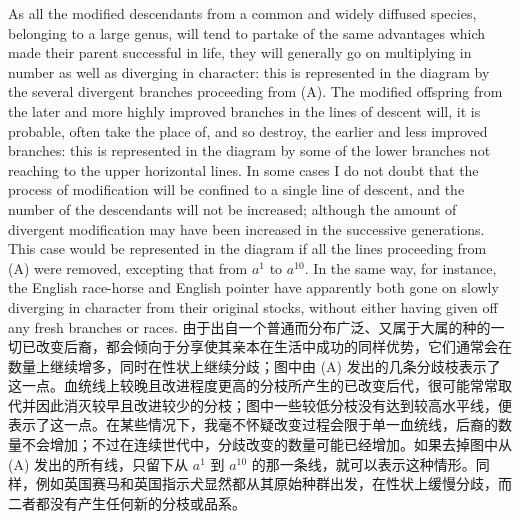 \darwinpair
{As all the modified descendants from a common and widely diffused species, belonging to a large genus, will tend to partake of the same advantages which made their parent successful in life, they will generally go on multiplying in number as well as diverging in character: this is represented in the diagram by the several divergent branches proceeding from (A). The modified offspring from the later and more highly improved branches in the lines of descent will, it is probable, often take the place of, and so destroy, the earlier and less improved branches: this is represented in the diagram by some of the lower branches not reaching to the upper horizontal lines. In some cases I do not doubt that the process of modification will be confined to a single line of descent, and the number of the descendants will not be increased; although the amount of divergent modification may have been increased in the successive generations. This case would be represented in the diagram if all the lines proceeding from (A) were removed, excepting that from $a^{1}$ to $a^{10}$. In the same way, for instance, the English race-horse and English pointer have apparently both gone on slowly diverging in character from their original stocks, without either having given off any fresh branches or races.}
{由于出自一个普通而分布广泛、又属于大属的种的一切已改变后裔，都会倾向于分享使其亲本在生活中成功的同样优势，它们通常会在数量上继续增多，同时在性状上继续分歧；图中由 (A) 发出的几条分歧枝表示了这一点。血统线上较晚且改进程度更高的分枝所产生的已改变后代，很可能常常取代并因此消灭较早且改进较少的分枝；图中一些较低分枝没有达到较高水平线，便表示了这一点。在某些情况下，我毫不怀疑改变过程会限于单一血统线，后裔的数量不会增加；不过在连续世代中，分歧改变的数量可能已经增加。如果去掉图中从 (A) 发出的所有线，只留下从 $a^{1}$ 到 $a^{10}$ 的那一条线，就可以表示这种情形。同样，例如英国赛马和英国指示犬显然都从其原始种群出发，在性状上缓慢分歧，而二者都没有产生任何新的分枝或品系。}

